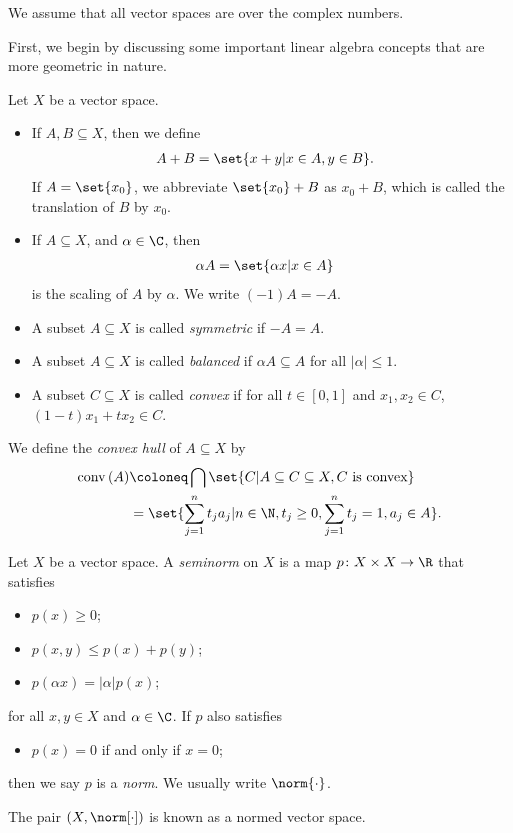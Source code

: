 \documentclass[10pt]{mypackage2}
\begin{document}
We assume that all vector spaces are over the complex numbers.\newline

First, we begin by discussing some important linear algebra concepts that are more geometric in nature.
\begin{definition}\label{def:vector_space_subset_operations}
  Let $X$ be a vector space.
  \begin{itemize}
    \item If $A,B\subseteq X$, then we define
      \begin{align*}
        A + B &= \set{x + y | x\in A,y\in B}.
      \end{align*}
      If $A = \set{x_0}$, we abbreviate $\set{x_0} + B$ as $x_0 + B$, which is called the translation of $B$ by $x_0$.
    \item If $A\subseteq X$, and $\alpha\in \C$, then
      \begin{align*}
        \alpha A &= \set{\alpha x | x\in A}
      \end{align*}
      is the scaling of $A$ by $\alpha$. We write $(-1)A = -A$.
    \item A subset $A\subseteq X$ is called \textit{symmetric} if $-A = A$.
    \item A subset $A\subseteq X$ is called \textit{balanced} if $\alpha A\subseteq A$ for all $\left\vert \alpha \right\vert\leq 1$.
    \item A subset $C\subseteq X$ is called \textit{convex} if for all $t\in [0,1]$ and $x_1,x_2\in C$, $\left(1-t\right)x_1 + tx_2 \in C$.
  \end{itemize}
  We define the \textit{convex hull} of $A\subseteq X$ by
  \begin{align*}
    \operatorname{conv}\left(A\right) &\coloneq \bigcap\set{C | A\subseteq C\subseteq X,C\text{ is convex}}\\
                                      &= \set{\sum_{j=1}^{n}t_ja_j | n\in\N,t_j\geq 0,\sum_{j=1}^{n}t_j = 1,a_j\in A}.
  \end{align*}
\end{definition}
\begin{definition}
  Let $X$ be a vector space. A \textit{seminorm} on $X$ is a map $p\colon X\times X\rightarrow \R$ that satisfies
  \begin{itemize}
    \item $p(x) \geq 0$;
    \item $p\left( x,y \right) \leq p\left( x \right) + p\left( y \right)$;
    \item $p\left( \alpha x \right) = \left\vert \alpha \right\vert p(x)$;
  \end{itemize}
  for all $x,y\in X$ and $\alpha\in \C$. If $p$ also satisfies
  \begin{itemize}
    \item $p\left( x \right) = 0$ if and only if $x = 0$;
  \end{itemize}
  then we say $p$ is a \textit{norm}. We usually write $\norm{\cdot}$.\newline

  The pair $\left( X,\norm[\cdot] \right)$ is known as a normed vector space.
\end{definition}
\end{document}
